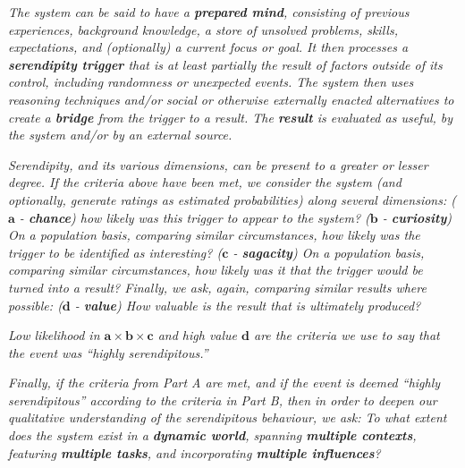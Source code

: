 \begin{description}[itemsep=4pt]
\item[\emph{(\textbf{A - Definitional characteristics})}] \emph{The
  system can be said to have a \emph{\textbf{prepared mind}},
  consisting of previous experiences, background knowledge, a store of
  unsolved problems, skills, expectations, and (optionally) a current
  focus or goal.  It then processes a \emph{\textbf{serendipity
  trigger}} that is at least partially the result of factors outside
  of its control, including randomness or unexpected events.  The
  system then uses reasoning techniques and/or social or otherwise
  externally enacted alternatives to create a \emph{\textbf{bridge}}
  from the trigger to a result.  The \emph{\textbf{result}} is
  evaluated as useful, by the system and/or by an external source.}
\item[\emph{(\textbf{B - Dimensions})}] \emph{Serendipity, and its
  various dimensions, can be present to a greater or lesser degree.
  If the criteria above have been met, we consider the system (and optionally, generate ratings as
  estimated probabilities) along several dimensions:
%
\emph{($\mathbf{a}$ - \textbf{chance})} how likely was this trigger to appear to
  the system?
%
\emph{($\mathbf{b}$ - \textbf{curiosity})} On a population basis, comparing
  similar circumstances, how likely was the trigger to be identified
  as interesting?
%
\emph{($\mathbf{c}$ - \textbf{sagacity})} On a population basis, comparing
  similar circumstances, how likely was it that the trigger
  would be turned into a result?
%
Finally, we ask, again, comparing similar results where possible:
\emph{($\mathbf{d}$ - \textbf{value})} How valuable is the result that
is ultimately produced?}

\medskip


\emph{Low likelihood in $\mathbf{a}\times\mathbf{b}\times\mathbf{c}$ 
 and high value $\mathbf{d}$ are the criteria we use to say that the event was ``highly serendipitous.''}

\item[\emph{(\textbf{C - Factors})}] \emph{Finally, if the criteria
  from Part A are met, and if the event is deemed ``highly
  serendipitous'' according to the criteria in Part B, then in order
  to deepen our qualitative understanding of the serendipitous
  behaviour, we ask: To what extent does the system exist in a
  \emph{\textbf{dynamic world}}, spanning \emph{\textbf{multiple
      contexts}}, featuring \emph{\textbf{multiple tasks}}, and
  incorporating \emph{\textbf{multiple influences}}?}
\end{description}

